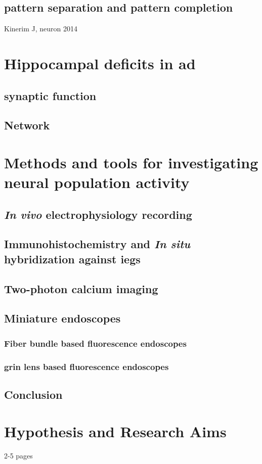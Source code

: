 \subsection{pattern separation and pattern completion}
    Kinerim J, neuron 2014

\section{Hippocampal deficits in \gls{ad}}
\subsection{synaptic function}
\subsection{Network}


\section{Methods and tools for investigating neural population activity}
\subsection{\textit{In vivo} electrophysiology recording}
\subsection{Immunohistochemistry and \textit{In situ} hybridization against \glspl{ieg}}
\subsection{Two-photon calcium imaging}
\subsection{Miniature endoscopes}
\subsubsection{Fiber bundle based fluorescence endoscopes}
\subsubsection{\gls{grin} lens based fluorescence endoscopes}
\subsection{Conclusion}


\section{Hypothesis and Research Aims}
2-5 pages
